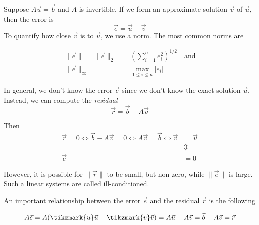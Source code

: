 Suppose $A\vec{u}=\vec{b}$ and $A$ is invertible. If we form an approximate
solution $\vec{v}$ of $\vec{u}$, then the error is
\begin{equation*}
  \vec{e} = \vec{u} - \vec{v}
\end{equation*}
To quantify how close $\vec{v}$ is to $\vec{u}$, we use a norm. The most common
norms are

\begin{align*}
  \| \vec{e} \| = \| \vec{e} \|_2 &= \left( \sum_{i=1}^n e_i^2\right)^{1/2} \quad \text{and}\\
  \| \vec{e} \|_\infty &= \underset{1 \leq i \leq n}{\max} | e_i |
\end{align*}

In general, we don't know the error $\vec{e}$ since we don't know the exact
solution $\vec{u}$. Instead, we can compute the \emph{residual}
\begin{equation*}
\vec{r} = \vec{b} - A \vec{v}
\end{equation*}

Then
\begin{align*}
  \vec{r} = 0 \Leftrightarrow
  \vec{b}-A\vec{v} = 0
  \Leftrightarrow A \vec{v} = \vec{b}
  \Leftrightarrow \vec{v}&=\vec{u}\\
                         &\Updownarrow\\
  \vec{e}&=0
\end{align*}

However, it is possible for $\|\vec{r}\|$ to be small, but non-zero, while
$\|\vec{e}\|$ is large. Such a linear systems are called ill-conditioned. 

An important relationship between the error $\vec{e}$ and the residual $\vec{r}$
is the following

\begin{equation*}
  A\vec{e} = A(
  \tikzmark{u}\vec{u}
  -
  \tikzmark{v}\vec{v}
  ) = A\vec{u} - A\vec{v} = \vec{b}-A\vec{v} = \vec{r}
\end{equation*}


\vspace{15pt}

